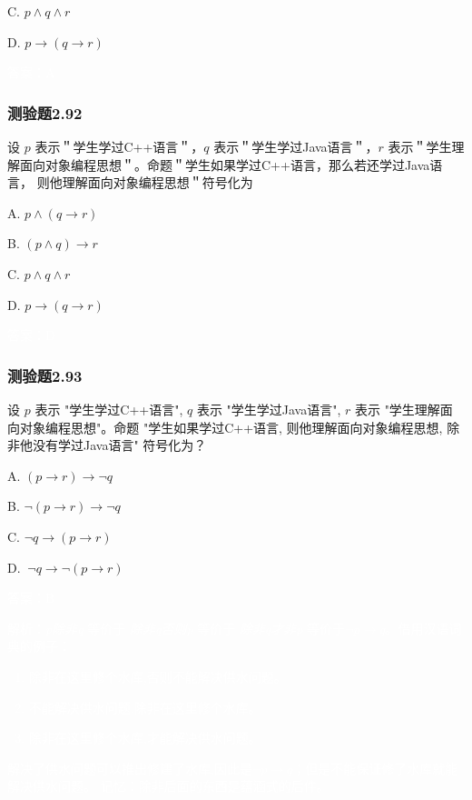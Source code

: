 \documentclass[UTF8, heading=true]{ctexart}
\begin{document}
C. $p \wedge q \wedge r$

D. $p \rightarrow(q \rightarrow r)$

\textcolor{white}{答案：A}  

\subsubsection{测验题2.92}

设 $p$ 表示＂学生学过C++语言＂，$q$ 表示＂学生学过Java语言＂，$r$ 
表示＂学生理解面向对象编程思想＂。命题＂学生如果学过C++语言，那么若还学过Java语言，
则他理解面向对象编程思想＂符号化为 $\qquad$

A. $
p \wedge(q \rightarrow r)
$


B. $
(p \wedge q) \rightarrow r
$


C. $
p \wedge q \wedge r
$


D.  $
p \rightarrow(q \rightarrow r)
$

\textcolor{white}{答案：D}


\subsubsection{测验题2.93}

设 $p$ 表示 "学生学过C++语言", $q$ 表示 "学生学过Java语言", 
$r$ 表示 "学生理解面向对象编程思想"。命题 "学生如果学过C++语言, 
则他理解面向对象编程思想, 除非他没有学过Java语言" 符号化为？

A. $(p \rightarrow r) \rightarrow \neg q$

B. $\neg(p \rightarrow r) \rightarrow \neg q$

C. $\neg q \rightarrow(p \rightarrow r)$

D. $\ \neg q \rightarrow \neg(p \rightarrow r)$

\textcolor{white}{答案：B}

\textcolor{white}{解析：\textit{p除非q} 等价于 \textit{除非q否则p} 等价于 \textit{除非q才非p} 
等价于$\neg p\rightarrow q$。借用汉语词典的例子：
\begin{enumerate}
  \item \textcolor{white}{除非在这里修个水库,否则不能解决供水问题。}
  \item \textcolor{white}{不能解决供水问题,除非在这里修个水库。}
  \item \textcolor{white}{除非在这里修个水库,才能解决供水问题。}
\end{enumerate}
解决了供水问题可以推出修建了水库,因此是$\neg p\rightarrow q$；但是不能保证修了水库就能解决供水问题。
记忆：除非后面的东西是蕴涵式的后件。
}
\end{document}
